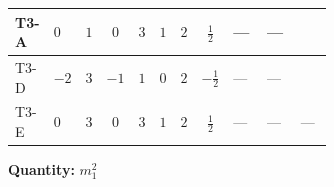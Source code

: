 \documentclass[8pt]{article}
\begin{document}
\begin{landscape}
\begin{longtable}{@{}llcccccc >{\raggedright\arraybackslash}p{0.21\linewidth} >{\raggedright\arraybackslash}p{0.21\linewidth} >{\raggedright\arraybackslash}p{0.21\linewidth}@{}}
\midrule
T3-A & $0$ & $1$ & $0$ & $3$ & $1$ & $2$ & $\frac{1}{2}$ & --- & --- & \scriptsize\adjustbox{max width=\linewidth}{$\begin{gathered} 6 {\lambda_{12}^{(1)}} {m_2^2}\end{gathered}$} \\
\midrule
T3-D & $-2$ & $3$ & $-1$ & $1$ & $0$ & $2$ & $-\frac{1}{2}$ & --- & --- & \scriptsize\adjustbox{max width=\linewidth}{$\begin{gathered} +2 {\lambda_{12}^{(1)}} {m_2^2}\end{gathered}$} \\
\midrule
T3-E & $0$ & $3$ & $0$ & $3$ & $1$ & $2$ & $\frac{1}{2}$ & --- & --- & --- \\
\midrule
\bottomrule
\end{longtable}
\clearpage
\noindent\textbf{Quantity: }$m_1^2$\par\smallskip

\end{landscape}
\end{document}
